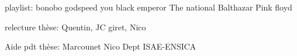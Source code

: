 
playlist:
bonobo
godspeed you black emperor
The national
Balthazar
Pink floyd

relecture thèse:
Quentin,
JC giret,
Nico

Aide pdt thèse:
Marcounet
Nico
Dept ISAE-ENSICA